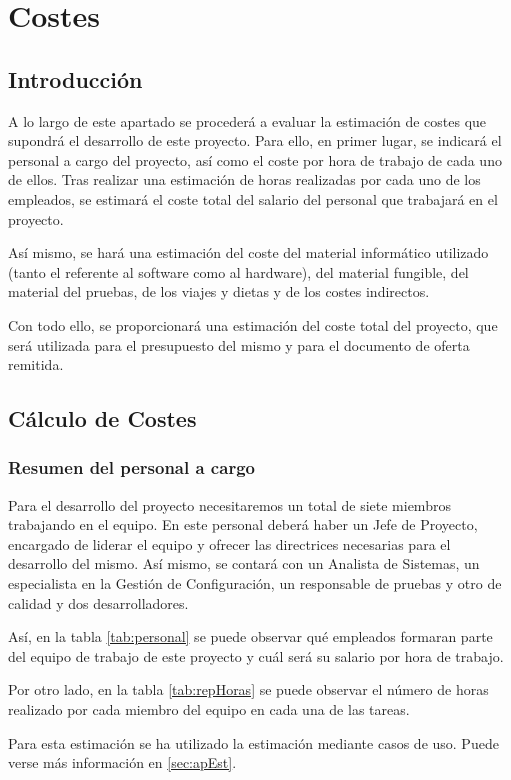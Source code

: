 
\chapter{Costes}
\clearpage

\section{Introducción}
\par A lo largo de este apartado se procederá a evaluar la estimación de costes que supondrá el desarrollo de este proyecto. Para ello, en primer lugar, se indicará el personal a cargo del proyecto, así como el coste por hora de trabajo de cada uno de ellos. Tras realizar una estimación de horas realizadas por cada uno de los empleados, se estimará el coste total del salario del personal que trabajará en el proyecto.
\par Así mismo, se hará una estimación del coste del material informático utilizado (tanto el referente al software como al hardware), del material fungible, del material del pruebas, de los viajes y dietas y de los costes indirectos.
\par Con todo ello, se proporcionará una estimación del coste total del proyecto, que será utilizada para el presupuesto del mismo y para el documento de oferta remitida.

\section{Cálculo de Costes}

\subsection{Resumen del personal a cargo}
\par Para el desarrollo del proyecto necesitaremos un total de siete miembros trabajando en el equipo. En este personal deberá haber un Jefe de Proyecto, encargado de liderar el equipo y ofrecer las directrices necesarias para el desarrollo del mismo. Así mismo, se contará con un Analista de Sistemas, un especialista en la Gestión de Configuración, un responsable de pruebas y otro de calidad y dos desarrolladores.
\par Así, en la tabla \ref{tab:personal} se puede observar qué empleados formaran parte del equipo de trabajo de este proyecto y cuál será su salario por hora de trabajo.
\par Por otro lado, en la tabla \ref{tab:repHoras} se puede observar el número de horas realizado por cada miembro del equipo en cada una de las tareas.
\par Para esta estimación se ha utilizado la estimación mediante casos de uso. Puede verse más información en \ref{sec:apEst}.

